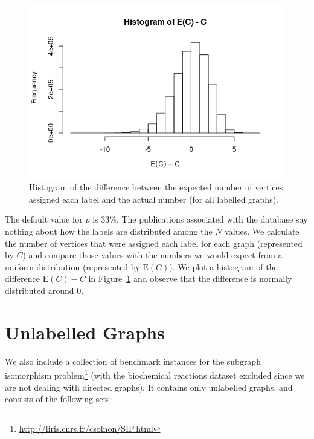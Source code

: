 \documentclass{l4proj}
\theoremstyle{definition}
\theoremstyle{remark}
\begin{document}
\begin{figure}
  \centering
  \includegraphics[scale=0.5]{images/labelling_histogram.png}
  \caption{Histogram of the difference between the expected number of vertices
    assigned each label and the actual number (for all labelled graphs).}
  \label{figure:labelling_histogram}
\end{figure}

The default value for $p$ is 33\%. The publications associated with the database
\cite{foggia2001-2, DBLP:journals/prl/SantoFSV03} say nothing about how the
labels are distributed among the $N$ values. We calculate the number of vertices
that were assigned each label for each graph (represented by $C$) and compare
those values with the numbers we would expect from a uniform distribution
(represented by $\mathrm{E}(C)$). We plot a histogram of the difference $\mathrm{E}(C) - C$ in
Figure~\ref{figure:labelling_histogram} and observe that the difference is
normally distributed around 0.

\section{Unlabelled Graphs} \label{sec:unlabelled}

We also include a collection of benchmark instances for the subgraph isomorphism
problem\footnote{\url{http://liris.cnrs.fr/csolnon/SIP.html}} (with the
biochemical reactions dataset excluded since we are not dealing with directed
graphs). It contains only unlabelled graphs, and consists of the following sets:
\end{document}
